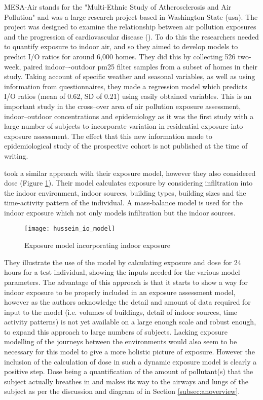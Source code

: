 MESA-Air stands for the "Multi-Ethnic Study of Atherosclerosis and Air Pollution" and was a large research project based in Washington State (\gls{usa}). The project was designed to examine the relationship between air pollution exposures and the progression of cardiovascular disease (\cite{Allen2012}). To do this the researchers needed to quantify exposure to indoor air, and so they aimed to develop models to predict I/O ratios for around 6,000 homes. They did this by collecting 526 two-week, paired indoor–-outdoor \gls{pm25} filter samples from a subset of homes in their study. Taking account of specific weather and seasonal variables, as well as using information from questionnaires, they made a regression model which predicts I/O ratios (mean of 0.62, SD of  0.21) using easily obtained variables. This is an important study in the cross--over area of air pollution exposure assessment, indoor--outdoor concentrations and epidemiology as it was the first study with a large number of subjects to incorporate variation in residential exposure into exposure assessment. The effect that this new information made to epidemiological study of the prospective cohort is not published at the time of writing.

\cite{Hussein2014} took a similar approach with their exposure model, however they also considered dose (Figure \ref{fig:husseiniomodel}). Their model calculates exposure by considering infiltration into the indoor environment, indoor sources, building types, building sizes and the time-activity pattern of the individual. A mass-balance model is used for the indoor exposure which not only models infiltration but the indoor sources.

\begin{figure}[H]
\centering
\texttt{[image: hussein\_io\_model]}
\caption{Exposure model incorporating indoor exposure}
\label{fig:husseiniomodel}
\end{figure}

They illustrate the use of the model by calculating exposure and dose for 24 hours for a test individual, showing the inputs needed for the various model parameters. The advantage of this approach is that it starts to show a way for indoor exposure to be properly included in an exposure assessment model, however as the authors acknowledge the detail and amount of data required for input to the model (i.e. volumes of buildings, detail of indoor sources, time activity patterns) is not yet available on a large enough scale and robust enough, to expand this approach to large numbers of subjects. Lacking exposure modelling of the journeys between the environments would also seem to be necessary for this model to give a more holistic picture of exposure. However the inclusion of the calculation of dose in such a dynamic exposure model is clearly a positive step. Dose being a quantification of the amount of pollutant(s) that the subject actually breathes in and makes its way to the airways and lungs of the subject as per the discussion and diagram of \cite{Brook2010} in Section \ref{subsec:anoverview}.

